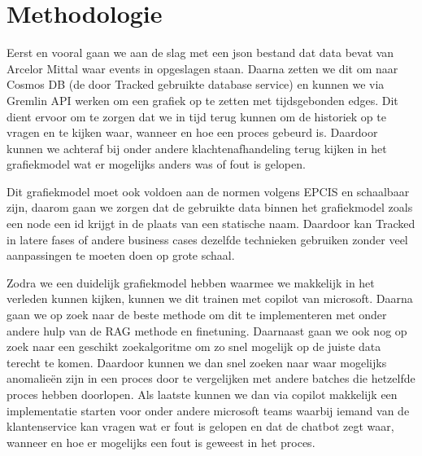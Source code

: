 \section{Methodologie}%
\label{sec:methodologie}
Eerst en vooral gaan we aan de slag met een json bestand dat data bevat van Arcelor Mittal waar events in opgeslagen staan.
Daarna zetten we dit om naar Cosmos DB (de door Tracked gebruikte database service) en kunnen we via Gremlin API werken om een grafiek op te zetten met tijdsgebonden edges. Dit dient ervoor om te zorgen dat we in tijd terug kunnen om de historiek op te vragen en te kijken waar, wanneer en hoe een proces gebeurd is.
Daardoor kunnen we achteraf bij onder andere klachtenafhandeling terug kijken in het grafiekmodel wat er mogelijks anders was of fout is gelopen.

Dit grafiekmodel moet ook voldoen aan de normen volgens EPCIS en schaalbaar zijn, daarom gaan we zorgen dat de gebruikte data binnen het grafiekmodel zoals een node een id krijgt in de plaats van een statische naam.
Daardoor kan Tracked in latere fases of andere business cases dezelfde technieken gebruiken zonder veel aanpassingen te moeten doen op grote schaal.

Zodra we een duidelijk grafiekmodel hebben waarmee we makkelijk in het verleden kunnen kijken, kunnen we dit trainen met copilot van microsoft.
Daarna gaan we op zoek naar de beste methode om dit te implementeren met onder andere hulp van de RAG methode en finetuning. Daarnaast gaan we ook nog op zoek naar een geschikt zoekalgoritme om zo snel mogelijk op de juiste data terecht te komen.
Daardoor kunnen we dan snel zoeken naar waar mogelijks anomalieën zijn in een proces door te vergelijken met andere batches die hetzelfde proces hebben doorlopen.
Als laatste kunnen we dan via copilot makkelijk een implementatie starten voor onder andere microsoft teams waarbij iemand van de klantenservice kan vragen wat er fout is gelopen en dat de chatbot zegt waar, wanneer en hoe er mogelijks een fout is geweest in het proces.




